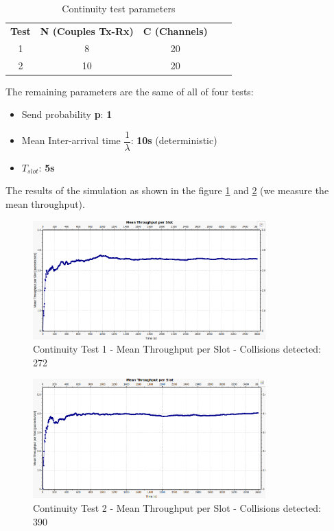 \begin{table}[H]
	\centering
		\begin{tabular}{|c|c|c|ll}
			\cline{1-3}
			{\textbf{Test}} & { \textbf{N (Couples Tx-Rx)}} & { \textbf{C (Channels)}} &  &  \\ \cline{1-3}
			1 & 8  & 20 &  &  \\ \cline{1-3}
			2 & 10 & 20 &  &  \\ \cline{1-3}
		\end{tabular}
	\caption{Continuity test parameters}
	\label{tab: continuity test}
\end{table}

\noindent The remaining parameters are the same of all of four tests:
\begin{itemize}
	\item Send probability \textbf{p}: \textbf{1}
	\item Mean Inter-arrival time $\dfrac{1}{\lambda}$: \textbf{10s} (deterministic)
	\item $T_{slot}$: \textbf{5s}
\end{itemize}

\noindent The results of the simulation as shown in the figure \ref{img: continuityTest1a} and \ref{img: continuityTest1b} (we measure the mean throughput).

\begin{figure}[H]
	\centering
	\includegraphics[width=0.8\textwidth]{img/continuityTest1a.png}
	\caption{Continuity Test 1 - Mean Throughput per Slot - Collisions detected: 272}
	\label {img: continuityTest1a}
\end{figure}

\begin{figure}[H]
	\centering
	\includegraphics[width=0.8\textwidth]{img/continuityTest1b.png}
	\caption{Continuity Test 2 - Mean Throughput per Slot - Collisions detected: 390}
	\label {img: continuityTest1b}
\end{figure}

